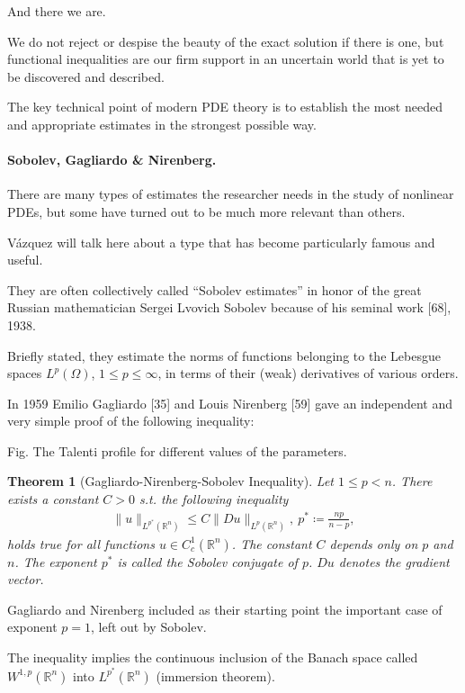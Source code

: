 \documentclass{article}
\newtheorem{theorem}{Theorem}
\begin{document}
%
And there we are.

We do not reject or despise the beauty of the exact solution if there is one, but functional inequalities are our firm support in an uncertain world that is yet to be discovered and described.

The key technical point of modern PDE theory is to establish the most needed and appropriate estimates in the strongest possible way.

\paragraph{Sobolev, Gagliardo \& Nirenberg.} There are many types of estimates the researcher needs in the study of nonlinear PDEs, but some have turned out to be much more relevant than others.

V\'azquez will talk here about a type that has become particularly famous and useful.

They are often collectively called ``Sobolev estimates'' in honor of the great Russian mathematician Sergei Lvovich Sobolev because of his seminal work [68], 1938.

Briefly stated, they estimate the norms of functions belonging to the Lebesgue spaces $L^p(\Omega)$, $1\le p\le\infty$, in terms of their (weak) derivatives of various orders.

In 1959 Emilio Gagliardo [35] and Louis Nirenberg [59] gave an independent and very simple proof of the following inequality:

\textsf{Fig. The Talenti profile for different values of the parameters.}

\begin{theorem}[Gagliardo-Nirenberg-Sobolev Inequality]
	Let $1\le p < n$. There exists a constant $C > 0$ s.t. the following inequality
	\begin{align*}
		\|u\|_{L^{p^*}(\mathbb{R}^n)}\le C\|Du\|_{L^p(\mathbb{R}^n)},\ p^*\coloneqq\frac{np}{n - p},
	\end{align*}
	holds true for all functions $u\in C_c^1(\mathbb{R}^n)$. The constant $C$ depends only on $p$ and $n$. The exponent $p^*$ is called the \emph{Sobolev conjugate} of $p$. $Du$ denotes the gradient vector.
\end{theorem}
Gagliardo and Nirenberg included as their starting point the important case of exponent $p = 1$, left out by Sobolev.

The inequality implies the continuous inclusion of the Banach space called $W^{1,p}(\mathbb{R}^n)$ into $L^{p^*}(\mathbb{R}^n)$ (immersion theorem).
\end{document}
